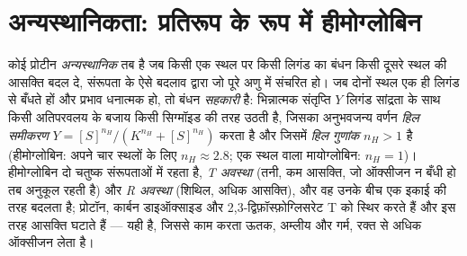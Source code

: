 \section{अन्यस्थानिकता: प्रतिरूप के रूप में हीमोग्लोबिन}

\begin{definition}[अन्यस्थानिकता और सहकारिता]\label{def:b3:structural-biology:allostery}
कोई प्रोटीन \emph{अन्यस्थानिक} तब है जब किसी एक स्थल पर किसी लिगंड का
बंधन किसी दूसरे स्थल की आसक्ति बदल दे, संरूपता के ऐसे बदलाव द्वारा जो
पूरे अणु में संचरित हो। जब दोनों स्थल एक ही लिगंड से बँधते हों और
प्रभाव धनात्मक हो, तो बंधन \emph{सहकारी} है: भिन्नात्मक संतृप्ति $Y$
लिगंड सांद्रता के साथ किसी अतिपरवलय के बजाय किसी सिग्मॉइड की तरह उठती
है, जिसका अनुभवजन्य वर्णन \emph{हिल समीकरण} $Y = [S]^{n_{H}}/(K^{n_{H}} +
[S]^{n_{H}})$ करता है और जिसमें \emph{हिल गुणांक} $n_{H} > 1$ है
(हीमोग्लोबिन: अपने चार स्थलों के लिए
$n_{H} \approx 2.8$; एक स्थल वाला मायोग्लोबिन: $n_{H} =
1$)। हीमोग्लोबिन दो चतुष्क संरूपताओं में रहता है,
\emph{T अवस्था} (तनी, कम आसक्ति, जो ऑक्सीजन न बँधी हो तब अनुकूल रहती है)
और \emph{R अवस्था} (शिथिल, अधिक आसक्ति), और वह उनके बीच एक इकाई की तरह
बदलता है; प्रोटॉन, कार्बन डाइऑक्साइड और 2,3-द्विफ़ॉस्फ़ोग्लिसरेट T को
स्थिर करते हैं और इस तरह आसक्ति घटाते हैं --- यही  है, जिससे
काम करता ऊतक, अम्लीय और गर्म, रक्त से अधिक ऑक्सीजन लेता है।
\end{definition}

